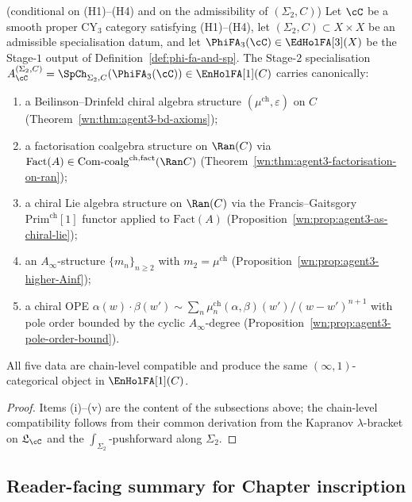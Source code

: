 \begin{theorem}
\label{wn:thm:agent3-stage2-consolidated}
\ClaimStatusConditional{} \textup{(conditional on (H1)--(H4) and on the admissibility of $(\Sigma_2,C)$)}
Let $\cC$ be a smooth proper CY$_3$ category satisfying (H1)--(H4), let $(\Sigma_2,C)\subset X\times X$ be an admissible specialisation datum, and let $\PhiFA_3(\cC)\in\EdHolFA[3](X)$ be the Stage-$1$ output of Definition~\ref{def:phi-fa-and-sp}. The Stage-$2$ specialisation $A^{(\Sigma_2,C)}_\cC=\SpCh_{\Sigma_2,C}(\PhiFA_3(\cC))\in\EnHolFA[1](C)$ carries canonically:
\begin{enumerate}[label=\textup{(\roman*)}]
 \item a Beilinson--Drinfeld chiral algebra structure $(\mu^{\mathrm{ch}},\varepsilon)$ on $C$ \textup{(Theorem~\ref{wn:thm:agent3-bd-axioms})};
 \item a factorisation coalgebra structure on $\Ran(C)$ via $\mathrm{Fact}(A)\in\mathrm{Com}\text{-}\mathrm{coalg}^{\mathrm{ch,fact}}(\Ran C)$ \textup{(Theorem~\ref{wn:thm:agent3-factorisation-on-ran})};
 \item a chiral Lie algebra structure on $\Ran(C)$ via the Francis--Gaitsgory $\mathrm{Prim}^{\mathrm{ch}}[1]$ functor applied to $\mathrm{Fact}(A)$ \textup{(Proposition~\ref{wn:prop:agent3-as-chiral-lie})};
 \item an $A_\infty$-structure $\{m_n\}_{n\geq 2}$ with $m_2=\mu^{\mathrm{ch}}$ \textup{(Proposition~\ref{wn:prop:agent3-higher-Ainf})};
 \item a chiral OPE $\alpha(w)\cdot\beta(w')\sim\sum_n\mu^{\mathrm{ch}}_n(\alpha,\beta)(w')/(w-w')^{n+1}$ with pole order bounded by the cyclic $A_\infty$-degree \textup{(Proposition~\ref{wn:prop:agent3-pole-order-bound})}.
\end{enumerate}
All five data are chain-level compatible and produce the same $(\infty,1)$-categorical object in $\EnHolFA[1](C)$.
\end{theorem}

\begin{proof}
Items (i)--(v) are the content of the subsections above; the chain-level compatibility follows from their common derivation from the Kapranov $\lambda$-bracket on $\mathfrak{L}_\cC$ and the $\int_{\Sigma_2}$-pushforward along $\Sigma_2$.
\end{proof}

\subsection{Reader-facing summary for Chapter inscription}
\label{wn:subsec:agent3-reader-summary}

